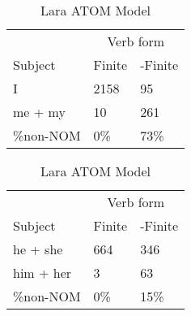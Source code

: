 \begin{table}[]
    \caption{Lara ATOM Model}
    \begin{minipage}{0.5\textwidth}
    \centering
    \begin{tabular}{@{}lll@{}}
        \toprule
         &\multicolumn{2}{c}{Verb form}\\
         \cline{2-3}
        Subject & Finite & -Finite \\
        \midrule
        I & 2158 & 95 \\
        me + my & 10 & 261 \\
        \hline
        \%non-NOM & 0\% & 73\% \\
        \bottomrule
    \end{tabular}
\end{minipage}
\begin{minipage}{0.5\textwidth}
    \centering
    \begin{tabular}{@{}lll@{}}
        \toprule
         &\multicolumn{2}{c}{Verb form}\\
         \cline{2-3}
        Subject & Finite & -Finite \\
        \midrule
        he + she & 664 & 346 \\
        him + her & 3 & 63 \\
        \hline
        \%non-NOM & 0\% & 15\% \\
        \bottomrule
    \end{tabular}
    \end{minipage}
    \begin{minipage}{0.5\textwidth}
    

\end{minipage}
\end{table}
